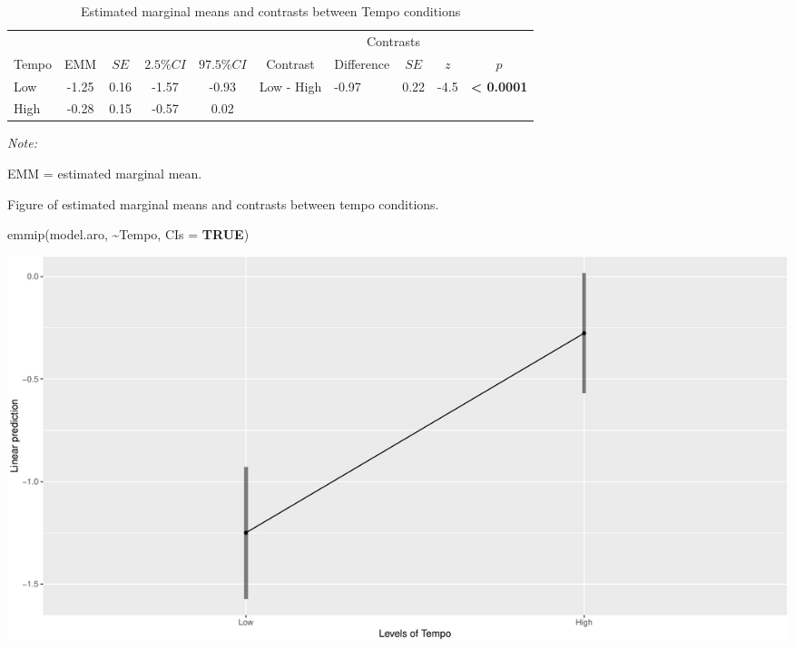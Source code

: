 \documentclass[
  bookmarksnumbered]{article}
\newenvironment{Shaded}{\begin{snugshade}}{\end{snugshade}}
\newcommand{\AttributeTok}[1]{\textcolor[rgb]{0.80,0.80,0.80}{#1}}
\newcommand{\ConstantTok}[1]{\textcolor[rgb]{0.86,0.64,0.64}{\textbf{#1}}}
\newcommand{\FunctionTok}[1]{\textcolor[rgb]{0.94,0.94,0.56}{#1}}
\newcommand{\NormalTok}[1]{\textcolor[rgb]{0.80,0.80,0.80}{#1}}
\newcommand{\SpecialCharTok}[1]{\textcolor[rgb]{0.86,0.64,0.64}{#1}}
\begin{document}
\begin{table}[H]

\caption{\label{tab:tab-aro-emms}Estimated marginal means and contrasts between Tempo conditions}
\centering
\begin{threeparttable}
\begin{tabular}[t]{lccccclccc}
\toprule
\multicolumn{5}{c}{ } & \multicolumn{5}{c}{Contrasts} \\
\cmidrule(l{3pt}r{3pt}){6-10}
Tempo & EMM & $SE$ & $2.5\% CI$ & $97.5\% CI$ & Contrast & Difference & $SE$ & $z$ & $p$\\
\midrule
Low & -1.25 & 0.16 & -1.57 & -0.93 & Low - High & -0.97 & 0.22 & -4.5 & \textbf{< 0.0001}\\
High & -0.28 & 0.15 & -0.57 & 0.02 &  &  &  &  & \\
\bottomrule
\end{tabular}
\begin{tablenotes}[para]
\item \textit{Note: } 
\item EMM = estimated marginal mean.
\end{tablenotes}
\end{threeparttable}
\end{table}

Figure of estimated marginal means and contrasts between tempo conditions.

\begin{Shaded}
\begin{Highlighting}[]
\FunctionTok{emmip}\NormalTok{(model.aro, }\SpecialCharTok{\textasciitilde{}}\NormalTok{Tempo, }\AttributeTok{CIs =} \ConstantTok{TRUE}\NormalTok{)}
\end{Highlighting}
\end{Shaded}

\includegraphics{Power_analysis_files/figure-latex/unnamed-chunk-19-1.pdf}
\end{document}
